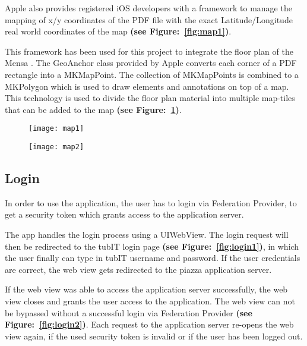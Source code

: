 Apple also provides registered iOS developers with a framework to manage the mapping of x/y coordinates of the PDF file with the exact Latitude/Longitude real world coordinates of the map
\textbf{(see Figure:~\ref{fig:map1})}.

This framework has been used for this project to integrate the floor plan of the Mensa \cite{AppleFootprint}. The GeoAnchor class provided by Apple converts each corner of a PDF rectangle into a MKMapPoint. The collection of MKMapPoints is combined to a MKPolygon which is used to draw elements and annotations on top of a map. This technology is used to divide the floor plan material into multiple map-tiles that can be added to the map \textbf{(see Figure:~\ref{fig:map2})}.


\begin{figure}
\centering
\begin{minipage}{.5\textwidth}
  \centering
  \texttt{[image: map1]}
  \label{fig:map1}
\end{minipage}%
\begin{minipage}{.5\textwidth}
  \centering
  \texttt{[image: map2]}
  \label{fig:map2}
\end{minipage}
\end{figure}


\subsection{Login}

In order to use the application, the user has to login via Federation Provider, to get
a security token which grants access to the application server.

The app handles the login process using a UIWebView. The login request will then be redirected
to the tubIT login page \textbf{(see Figure:~\ref{fig:login1})}, in which the user finally can type in tubIT username and password. If the user credentials are correct, the web view gets redirected to the piazza application server.

If the web view was able to access the application server successfully, the web view closes and grants the user access to the application. The web view can not be bypassed without a successful login via Federation Provider \textbf{(see Figure:~\ref{fig:login2})}. Each request to the application server re-opens the web view again, if the used security token is invalid or if the user has been logged out.


